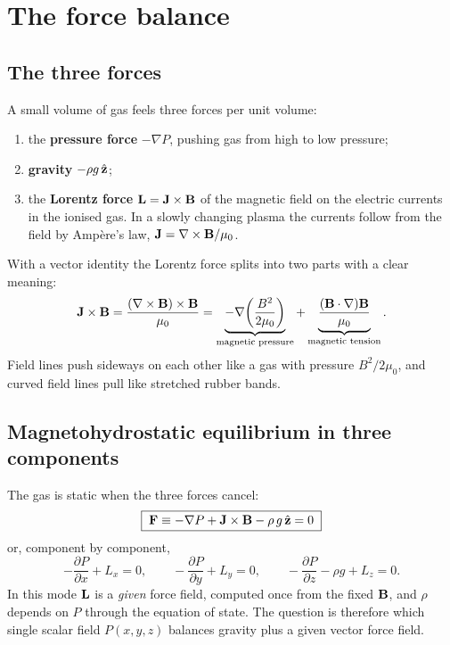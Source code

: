 \section{The force balance}\label{sec:force}
\subsection{The three forces}
A small volume of gas feels three forces per unit volume:
\begin{enumerate}
\item the \textbf{pressure force} $-\nabla P$, pushing gas from high to low pressure;
\item \textbf{gravity} $-\rho g\,\hat{\mathbf z}$;
\item the \textbf{Lorentz force} $\mathbf L=\mathbf J\times\mathbf B$ of the magnetic field on the electric currents in the ionised gas. In a slowly
changing plasma the currents follow from the field by Amp\`ere's law, $\mathbf J=\nabla\times\mathbf B/\mu_0$.
\end{enumerate}
With a vector identity the Lorentz force splits into two parts with a clear meaning:
\begin{equation}
\mathbf J\times\mathbf B=\frac{(\nabla\times\mathbf B)\times\mathbf B}{\mu_0}=\underbrace{-\nabla\!\left(\frac{B^2}{2\mu_0}\right)}_{\text{magnetic pressure}}
+\underbrace{\frac{(\mathbf B\cdot\nabla)\mathbf B}{\mu_0}}_{\text{magnetic tension}} .\label{eq:lorentz}
\end{equation}
Field lines push sideways on each other like a gas with pressure $B^2/2\mu_0$, and curved field lines pull like stretched
rubber bands.

\subsection{Magnetohydrostatic equilibrium in three components}
The gas is static when the three forces cancel:
\begin{equation}
\boxed{\;\mathbf F\equiv-\nabla P+\mathbf J\times\mathbf B-\rho\,g\,\hat{\mathbf z}=0\;}\label{eq:mhs}
\end{equation}
or, component by component,
\begin{equation}
-\frac{\partial P}{\partial x}+L_x=0,\qquad -\frac{\partial P}{\partial y}+L_y=0,\qquad -\frac{\partial P}{\partial z}-\rho g+L_z=0 .
\label{eq:mhs3}
\end{equation}
In this mode $\mathbf L$ is a \emph{given} force field, computed once from the fixed $\mathbf B$, and $\rho$ depends on $P$ through the
equation of state. The question is therefore which single scalar field $P(x,y,z)$ balances gravity plus a given vector
force field.

